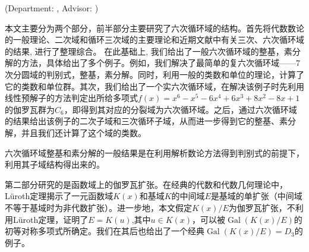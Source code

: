\begin{center}
	{\erhao \ustc@entitle}
	
	{\sihao \ustc@enauthor}
	
	{(Department: \sihao \ustc@endepart, Advisor: \ustc@enadvisor)}
\end{center}

\begin{cnabstract}
本文主要分为两个部分，前半部分主要研究了六次循环域的结构。首先将代数数论的一般理论、二次域和循环三次域的主要理论和近期文献中有关三次、六次循环域的结果, 进行了整理综合。 在此基础上, 我们给出了一般六次循环域的整基，素分解的方法，具体给出了多个例子。例如，我们解决了最简单的复六次循环域——7次分圆域的判别式，整基，素分解。同时，利用一般的类数和单位的理论，计算了它的类数和单位群。其次，我们给出了一个实六次循环域，在解决该例子时先利用线性预解子的方法判定出所给多项式$f(x)=x^6-x^5-6x^4+6x^3+8x^2-8x+1$的伽罗瓦群为$C_6$，即得到其对应的分裂域为六次循环域。之后，通过六次循环域的结果给出该例子的二次子域和三次循环子域，从而进一步得到它的整基、素分解，并且我们还计算了这个域的类数。

六次循环域整基和素分解的一般结果是在利用解析数论方法得到判别式的前提下，利用其子域结构得出来的。

第二部分研究的是函数域上的伽罗瓦扩张。在经典的代数和代数几何理论中，L\"{u}roth定理揭示了一元函数域$K(x)$和基域$K$的中间域$E$是基域的单扩张（中间域不等于基域时为非代数扩张）。进一步地，本文假定$K(x)/E$为伽罗瓦扩张，不利用L\"{u}roth定理，证明了$E=K(u)$,其中$u\in K(x)$，可以被$\operatorname{Gal}(K(x)/E)$的初等对称多项式所确定。我们在其后也给出了一个经典$\operatorname{Gal}(K(x)/E)=D_3$的例子。

\end{cnabstract}

